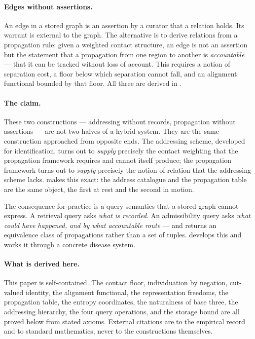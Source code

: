 \documentclass[11pt,twocolumn,a4paper]{article}
\theoremstyle{thmstyle}
\theoremstyle{definition}
\theoremstyle{remark}
\begin{document}
\paragraph{Edges without assertions.}
An edge in a stored graph is an assertion by a curator that a relation
holds. Its warrant is external to the graph. The alternative is to
derive relations from a propagation rule: given a weighted contact
structure, an edge is not an assertion but the statement that a
propagation from one region to another is \emph{accountable} ---
that it can be tracked without loss of account. This requires a
notion of separation cost, a floor below which separation cannot fall,
and an alignment functional bounded by that floor. All three are
derived in .

\paragraph{The claim.}
These two constructions --- addressing without records, propagation
without assertions --- are not two halves of a hybrid system. They are
the same construction approached from opposite ends. The addressing
scheme, developed for identification, turns out to \emph{supply}
precisely the contact weighting that the propagation framework
requires and cannot itself produce; the propagation framework turns
out to \emph{supply} precisely the notion of relation that the
addressing scheme lacks.  makes this exact: the
address catalogue and the propagation table are the same object,
the first at rest and the second in motion.

The consequence for practice is a query semantics that a stored graph
cannot express. A retrieval query asks \emph{what is recorded}. An
admissibility query asks \emph{what could have happened, and by what
accountable route} --- and returns an equivalence class of
propagations rather than a set of tuples.  develops
this and  works it through a concrete disease system.

\paragraph{What is derived here.}
This paper is self-contained. The contact floor, individuation by
negation, cut-valued identity, the alignment functional, the
representation freedoms, the propagation table, the entropy
coordinates, the naturalness of base three, the addressing hierarchy,
the four query operations, and the storage bound are all proved
below from stated axioms. External citations are to the empirical
record and to standard mathematics, never to the constructions
themselves.
\end{document}
